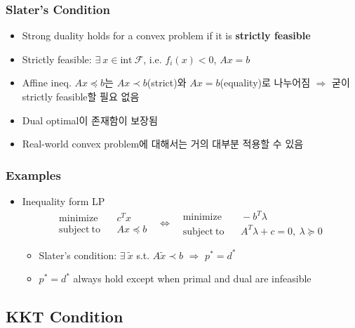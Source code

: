 \subsubsection*{Slater's Condition}
\begin{itemize}
    \item Strong duality holds for a convex problem if it is \textbf{strictly feasible}
    \item Strictly feasible: $\exists~x\in\mathrm{int}~\mathcal{F}$, i.e. $f_i(x)<0$, $Ax=b$
    \item Affine ineq. $Ax\preceq b$는 $Ax\prec b$(strict)와 $Ax=b$(equality)로 나누어짐 $\Rightarrow$ 굳이 strictly feasible할 필요 없음
    \item Dual optimal이 존재함이 보장됨
    \item Real-world convex problem에 대해서는 거의 대부분 적용할 수 있음
\end{itemize}

\subsubsection*{Examples}
\begin{itemize}
    \item Inequality form LP
        $$ \begin{aligned}
            \mathrm{minimize}~~&~~c^Tx \\
            \mathrm{subject~to}~~&~~Ax\preceq b
        \end{aligned}~~~\Leftrightarrow~~~\begin{aligned}
            \mathrm{minimize}~~&~~-b^T\lambda \\
            \mathrm{subject~to}~~&~~A^T\lambda+c=0,~\lambda\succeq 0
        \end{aligned} $$
    \begin{itemize}
        \item Slater's condition: $\exists~\tilde{x}$ s.t. $A\tilde{x}\prec b$ $\Rightarrow$ $p^\ast=d^\ast$
        \item $p^\ast=d^\ast$ always hold except when primal and dual are infeasible
    \end{itemize}
\end{itemize}

\subsection{KKT Condition}
